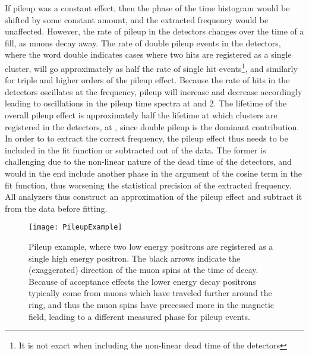 If pileup was a constant effect, then the phase of the time histogram would be shifted by some constant amount, and the extracted \wa frequency would be unaffected. However, the rate of pileup in the detectors changes over the time of a fill, as muons decay away. The rate of double pileup events in the detectors, where the word double indicates cases where two hits are registered as a single cluster, will go approximately as half the rate of single hit events\footnote{It is not exact when including the non-linear dead time of the detectors}, and similarly for triple and higher orders of the pileup effect. Because the rate of hits in the detectors oscillates at the \gmtwo frequency, pileup will increase and decrease accordingly leading to oscillations in the pileup time spectra at \wa and 2\wa. The lifetime of the overall pileup effect is approximately half the lifetime at which clusters are registered in the detectors, at \taumu, since double pileup is the dominant contribution. In order to to extract the correct \wa frequency, the pileup effect thus needs to be included in the fit function or subtracted out of the data. The former is challenging due to the non-linear nature of the dead time of the detectors, and would in the end include another phase in the argument of the cosine term in the fit function, thus worsening the statistical precision of the extracted \wa frequency. All analyzers thus construct an approximation of the pileup effect and subtract it from the data before fitting.




\begin{figure}[]
    \centering
    \texttt{[image: PileupExample]}
    \caption[Pileup example]{Pileup example, where two low energy positrons are registered as a single high energy positron. The black arrows indicate the (exaggerated) direction of the muon spins at the time of decay. Because of acceptance effects the lower energy decay positrons typically come from muons which have traveled further around the ring, and thus the muon spins have precessed more in the magnetic field, leading to a different measured \gmtwo phase for pileup events.}
    \label{fig:PileupExample}
\end{figure}


